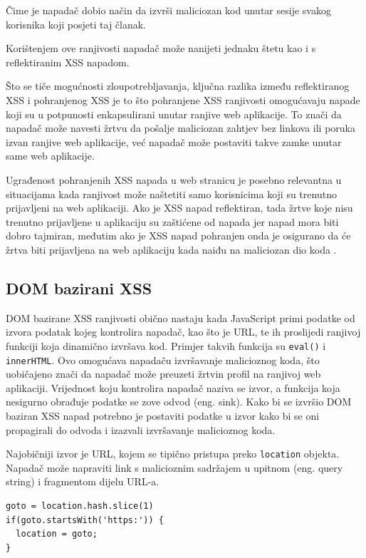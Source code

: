 \documentclass[12pt, oneside, onecolumn]{book}
\begin{document}
{Čime je napadač dobio način da izvrši maliciozan kod unutar sesije svakog korisnika koji posjeti taj članak.

Korištenjem ove ranjivosti napadač može nanijeti jednaku štetu kao i s reflektiranim XSS napadom. 

Što se tiče mogućnosti zloupotrebljavanja, ključna razlika između reflektiranog XSS i pohranjenog XSS je to što pohranjene XSS ranjivosti omogućavaju napade koji su u potpunosti enkapsulirani unutar ranjive web aplikacije. To znači da napadač može navesti žrtvu da pošalje maliciozan zahtjev bez linkova ili poruka izvan ranjive web aplikacije, već napadač može postaviti takve zamke unutar same web aplikacije.

\pagebreak 

Ugrađenost pohranjenih XSS napada u web stranicu je posebno relevantna u situacijama kada ranjivost može naštetiti samo korisnicima koji su trenutno prijavljeni na web aplikaciji. Ako je XSS napad reflektiran, tada žrtve koje nisu trenutno prijavljene u aplikaciju su zaštićene od napada jer napad mora biti dobro tajmiran, međutim ako je XSS napad pohranjen onda je osigurano da će žrtva biti prijavljena na web aplikaciju kada naiđu na maliciozan dio koda \cite{xssstor}.

\subsection{DOM bazirani XSS}
DOM bazirane XSS ranjivosti obično nastaju kada JavaScript primi podatke od izvora podatak kojeg kontrolira napadač, kao što je URL, te ih proslijedi ranjivoj funkciji koja dinamično izvršava kod. Primjer takvih funkcija su \texttt{eval()} i \texttt{innerHTML}. Ovo omogućava napadaču izvršavanje malicioznog koda, što uobičajeno znači da napadač može preuzeti žrtvin profil na ranjivoj web aplikaciji. Vrijednost koju kontrolira napadač naziva se izvor, a funkcija koja nesigurno obrađuje podatke se zove odvod (eng. sink). Kako bi se izvršio DOM baziran XSS napad potrebno je postaviti podatke u izvor kako bi se oni propagirali do odvoda i izazvali izvršavanje malicioznog koda.

Najobičniji izvor je URL, kojem se tipično pristupa preko \texttt{location} objekta. Napadač može napraviti link s malicioznim sadržajem u upitnom (eng. query string) i fragmentom dijelu URL-a.

\begin{verbatim}
goto = location.hash.slice(1)
if(goto.startsWith('https:')) {
  location = goto;
}
\end{verbatim}

}
\end{document}
